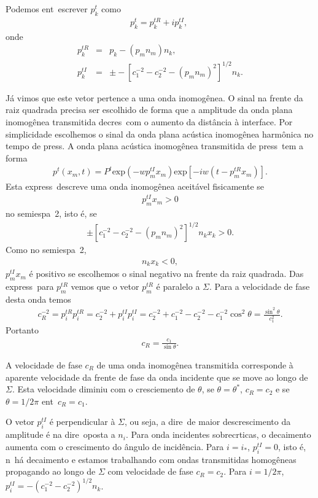 Podemos ent\ao\ escrever
$p_k^t$ como
\begin{eqnarray}
p_k^t = p_k^{tR} + ip_k^{tI},\; 
\end{eqnarray}
onde
\begin{eqnarray}
p_k^{tR} &=& p_k - (p_m n_m)n_k,\\
p_k^{tI} &=& \pm - [c_1^{-2} - c_2^{-2} - (p_m n_m)^2]^{1/2}n_k.
\end{eqnarray}

J\'a vimos que este vetor pertence a uma onda inomog\^enea. O sinal na
frente da raiz quadrada precisa ser escolhido de forma que a amplitude
da onda plana inomog\^enea transmitida decres\ca\ com o aumento da
dist\^ancia \`a interface. Por simplicidade escolhemos o sinal da onda
plana ac\'ustica inomog\^enea harm\^onica no tempo de press\ao. A onda
plana ac\'ustica inomog\^enea transmitida de press\ao\ tem a forma
\begin{eqnarray}
p^t(x_{m},t) = P^t\mbox{exp}(-wp_{m}^{tI}x_{m})\mbox{exp}[-iw(t-p_{m}^{tR}x_{m})].
\end{eqnarray} 
Esta express\ao\ descreve uma onda inomog\^enea aceit\'avel fisicamente
se
\begin{eqnarray}
p_{m}^{tI}x_{m} > 0
\end{eqnarray}
no semiespa\co\ 2, isto \'e, se
\begin{eqnarray}
\pm [c_1^{-2} - c_2^{-2} - (p_m n_m)^2]^{1/2}n_k x_k > 0. 
\end{eqnarray}
Como no semiespa\co\ 2,
\begin{eqnarray}
n_k x_k < 0,
\end{eqnarray}
$p_{m}^{tI}x_{m}$ \'e positivo se escolhemos o sinal negativo na frente
da raiz quadrada. Das express\oes\ para $p_{m}^{tR}$ vemos que o vetor
$p_{m}^{tR}$ \'e paralelo a $\Sigma$. Para a velocidade de fase desta
onda temos
\begin{eqnarray}
c_R^{-2} = p_i^{tR}p_i^{tR} = c_2^{-2} + p_i^{tI}p_i^{tI} = c_2^{-2} + c_1^{-2} - c_2^{-2} - c_1^{-2}\cos^2 \theta = \frac{\sin^2 \theta}{c_1^2}.
\end{eqnarray}
Portanto
\begin{eqnarray}
c_R = \frac{c_1}{\sin \theta}.
\end{eqnarray}

A velocidade de fase $c_R$ de uma onda inomog\^enea transmitida
corresponde \`a aparente velocidade da frente de fase da onda incidente
que se move ao longo de $\Sigma$. Esta velocidade diminiu com o
cresciemento de $\theta$, se $\theta = \theta^{*}$, $c_R = c_2$ e se
$\theta = 1/2\pi$ ent\ao\ $c_R = c_1$.

O vetor $p_i^{tI}$ \'e perpendicular \`a $\Sigma$, ou seja, a dire\cao\
de maior descrescimento da amplitude \'e na dire\cao\ oposta a $n_i$.
Para onda incidentes sobrecr\ih ticas, o decaimento aumenta com o
crescimento do \^angulo de incid\^encia. Para $i=i_{*}$, $p_i^{tI} = 0$,
isto \'e, n\ao\ h\'a decaimento e estamos trabalhando com ondas
transmitidas homog\^eneas propagando ao longo de $\Sigma$ com velocidade
de fase $c_R = c_2$. Para $i = 1/2\pi$, $p_i^{tI} = -(c_1^{-2} -
c_2^{-2})^{1/2}n_k$.

